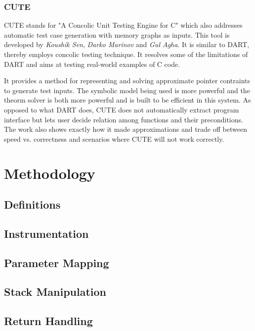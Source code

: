 \documentclass[12pt,oneside]{book}
\begin{document}
\newpage


\subsection{CUTE}
CUTE stands for "A Concolic Unit Testing Engine for C" which also addresses automatic test case generation with memory graphs as inputs. This tool is developed by \textit{Koushik Sen}, \textit{Darko Marinov} and \textit{Gul Agha}. It is similar to DART, thereby employs concolic testing technique. It resolves some of the limitations of DART and aims at testing real-world examples of C code.

It provides a method for representing and solving approximate pointer contraints to generate test inputs. The symbolic model being used is more powerful and the theorm solver is both more powerful and is built to be efficient in this system. As opposed to what DART does, CUTE does not automatically extract program interface but lets user decide relation among functions and their preconditions. The work also shows exactly how it made approximations and trade off between speed vs. correctness and scenarios where CUTE will not work correctly.






\newpage


\chapter{Methodology}
\section{Definitions}
\section{Instrumentation}
\section{Parameter Mapping}
\section{Stack Manipulation}
\section{Return Handling}
\end{document}
